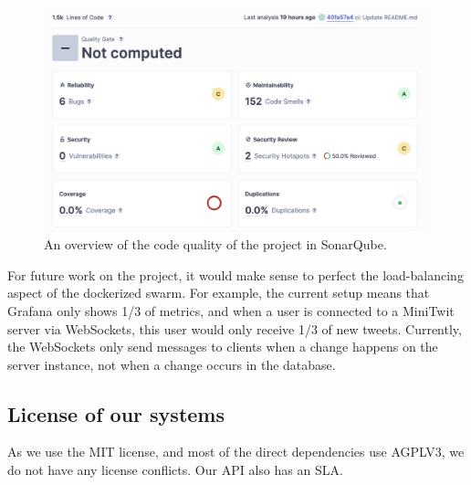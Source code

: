 \begin{figure}[H]
    \centering
    \includegraphics[width=\textwidth]{images/sonarStats.png}
    \caption{An overview of the code quality of the project in SonarQube.}
    \label{fig:sonarQubeOverview}
\end{figure}


For future work on the project, it would make sense to perfect the load-balancing aspect of the dockerized swarm. For example, the current setup means that Grafana only shows 1/3 of metrics, and when a user is connected to a MiniTwit server via WebSockets, this user would only receive 1/3 of new tweets. Currently, the WebSockets only send messages to clients when a change happens on the server instance, not when a change occurs in the database.

\subsection{License of our systems}
As we use the MIT license, and most of the direct dependencies use AGPLV3, we do not have any license conflicts. Our API also has an SLA.